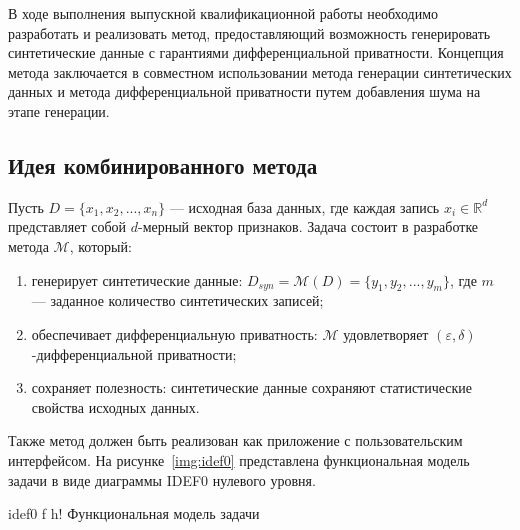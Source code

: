 В ходе выполнения выпускной квалификационной работы необходимо разработать и реализовать метод, предоставляющий возможность генерировать синтетические данные с гарантиями дифференциальной приватности.
Концепция метода заключается в совместном использовании метода генерации синтетических данных и метода дифференциальной приватности путем добавления шума на этапе генерации.

\subsection{Идея комбинированного метода}

Пусть $D = \{x_1, x_2, ..., x_n\}$ --- исходная база данных, где каждая запись $x_i \in \mathbb{R}^d$ представляет собой $d$-мерный вектор признаков. Задача состоит в разработке метода $\mathcal{M}$, который:
\begin{enumerate}[label*=---]
\item генерирует синтетические данные: $D_{syn} = \mathcal{M}(D) = \{y_1, y_2, ..., y_m\}$, где $m$ --- заданное количество синтетических записей;
\item обеспечивает дифференциальную приватность: $\mathcal{M}$ удовлетворяет $(\varepsilon, \delta)$-дифференциальной приватности;
\item сохраняет полезность: синтетические данные сохраняют статистические свойства исходных данных.
\end{enumerate}


Также метод должен быть реализован как приложение с пользовательским интерфейсом.
На рисунке~\ref{img:idef0} представлена функциональная модель задачи в виде
диаграммы IDEF0 нулевого уровня.

{idef0} %
{f} %
{h!} %
{\textwidth} %
{Функциональная модель задачи} %




